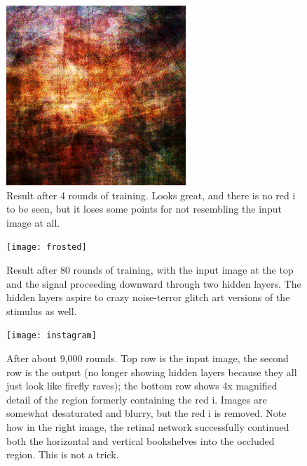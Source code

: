\documentclass[twocolumn]{article}
\begin{document}
\begin{figure}[bth]
\begin{center}
\includegraphics[width=0.65 \linewidth]{cure}
\end{center}
\caption{Result after 4 rounds of training. Looks great, and there is no
red i to be seen, but it loses some points for not resembling the
input image at all.} \label{fig:cure}
\end{figure}

\begin{figure}[htb]
\begin{center}
\texttt{[image: frosted]}
\end{center}
\caption{Result after 80 rounds of training, with the input image at the top
and the signal proceeding downward through two hidden layers. The hidden layers
aspire to crazy noise-terror glitch art versions of the stimulus as well.} \label{fig:frosted}
\end{figure}

\begin{figure}[htb]
\begin{center}
\texttt{[image: instagram]}
\end{center}
\caption{After about 9,000 rounds. Top row is the input image, the
second row is the output (no longer showing hidden layers because
they all just look like firefly raves); the bottom row shows 4x
magnified detail of the region formerly containing the red i.
Images are somewhat desaturated and blurry, but the red i is removed.
Note how in the right image, the retinal network successfully continued
both the horizontal and vertical bookshelves into the occluded region.
This is not a trick.} \label{fig:instagram}
\end{figure}
\end{document}
